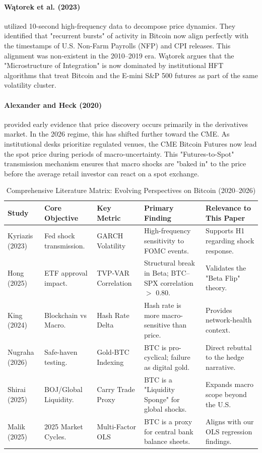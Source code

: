 \documentclass[10pt, conference, compsocconf]{IEEEtran}
\begin{document}
\paragraph{Wątorek et al. (2023)} utilized 10-second high-frequency data to decompose price dynamics. They identified that "recurrent bursts" of activity in Bitcoin now align perfectly with the timestamps of U.S. Non-Farm Payrolls (NFP) and CPI releases. This alignment was non-existent in the 2010--2019 era. Wątorek argues that the "Microstructure of Integration" is now dominated by institutional HFT algorithms that treat Bitcoin and the E-mini S\&P 500 futures as part of the same volatility cluster.

\paragraph{Alexander and Heck (2020)} provided early evidence that price discovery occurs primarily in the derivatives market. In the 2026 regime, this has shifted further toward the CME. As institutional desks prioritize regulated venues, the CME Bitcoin Futures now lead the spot price during periods of macro-uncertainty. This "Futures-to-Spot" transmission mechanism ensures that macro shocks are "baked in" to the price before the average retail investor can react on a spot exchange.

\begin{table}[t]
\caption{Comprehensive Literature Matrix: Evolving Perspectives on Bitcoin (2020--2026)}
\centering
\small
\renewcommand{\arraystretch}{1.5}
\begin{tabularx}{\textwidth}{|l|X|l|X|X|}
\hline
\textbf{Study} & \textbf{Core Objective} & \textbf{Key Metric} & \textbf{Primary Finding} & \textbf{Relevance to This Paper} \\ \hline
Kyriazis (2023) & Fed shock transmission. & GARCH Volatility & High-frequency sensitivity to FOMC events. & Supports H1 regarding shock response. \\ \hline
Hong (2025) & ETF approval impact. & TVP-VAR Correlation & Structural break in Beta; BTC--SPX correlation $>$ 0.80. & Validates the "Beta Flip" theory. \\ \hline
King (2024) & Blockchain vs Macro. & Hash Rate Delta & Hash rate is more macro-sensitive than price. & Provides network-health context. \\ \hline
Nugraha (2026) & Safe-haven testing. & Gold-BTC Indexing & BTC is pro-cyclical; failure as digital gold. & Direct rebuttal to the hedge narrative. \\ \hline
Shirai (2025) & BOJ/Global Liquidity. & Carry Trade Proxy & BTC is a "Liquidity Sponge" for global shocks. & Expands macro scope beyond the U.S. \\ \hline
Malik (2025) & 2025 Market Cycles. & Multi-Factor OLS & BTC is a proxy for central bank balance sheets. & Aligns with our OLS regression findings. \\ \hline
\end{tabularx}
\label{tab:expanded_matrix}
\end{table}
\end{document}
